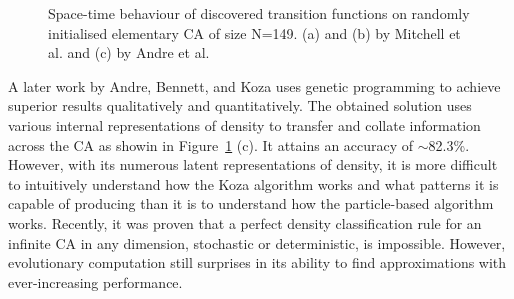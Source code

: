\begin{figure}[H]
\centering
            \hfill
            \hfill
            \hfill
            \caption{Space-time behaviour of discovered transition functions on randomly initialised elementary CA of size N=149. (a) and (b) by Mitchell et al.\cite{mitchell1996evolving} and (c) by Andre et al.\cite{andre1996discovery}}
\label{fig:1d-transitions}
\end{figure}

A later work by Andre, Bennett, and Koza\cite{andre1996discovery} uses genetic programming to achieve superior results qualitatively and quantitatively. The obtained solution uses various internal representations of density to transfer and collate information across the CA as showin in Figure~\ref{fig:1d-transitions} (c). It attains an accuracy of $\sim$82.3\%. However, with its numerous latent representations of density, it is more difficult to intuitively understand how the Koza algorithm works and what patterns it is capable of producing than it is to understand how the particle-based algorithm works. Recently, it was proven that a perfect density classification rule for an infinite CA in any dimension, stochastic or deterministic, is impossible\cite{buvsic2012density}. However, evolutionary computation still surprises in its ability to find approximations with ever-increasing performance. 

